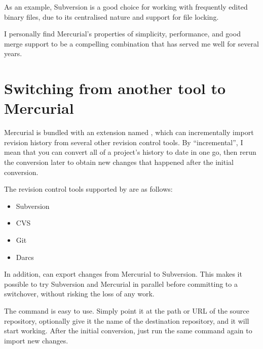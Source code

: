 As an example, Subversion is a good choice for working with frequently
edited binary files, due to its centralised nature and support for
file locking.

I personally find Mercurial's properties of simplicity, performance,
and good merge support to be a compelling combination that has served
me well for several years.


\section{Switching from another tool to Mercurial}

Mercurial is bundled with an extension named , which
can incrementally import revision history from several other revision
control tools.  By ``incremental'', I mean that you can convert all of
a project's history to date in one go, then rerun the conversion later
to obtain new changes that happened after the initial conversion.

The revision control tools supported by  are as
follows:
\begin{itemize}
\item Subversion
\item CVS
\item Git
\item Darcs
\end{itemize}

In addition,  can export changes from Mercurial to
Subversion.  This makes it possible to try Subversion and Mercurial in
parallel before committing to a switchover, without risking the loss
of any work.

The  command is easy to use.  Simply point it
at the path or URL of the source repository, optionally give it the
name of the destination repository, and it will start working.  After
the initial conversion, just run the same command again to import new
changes.


